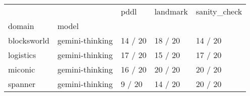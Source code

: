 \begin{tabular}{lllll}
\toprule
 &  & pddl & landmark & sanity\_check \\
domain & model &  &  &  \\
\midrule
blocksworld & gemini-thinking & 14 / 20 & 18 / 20 & 14 / 20 \\
\cline{1-5}
logistics & gemini-thinking & 17 / 20 & 15 / 20 & 17 / 20 \\
\cline{1-5}
miconic & gemini-thinking & 16 / 20 & 20 / 20 & 20 / 20 \\
\cline{1-5}
spanner & gemini-thinking & 9 / 20 & 14 / 20 & 20 / 20 \\
\cline{1-5}
\end{tabular}